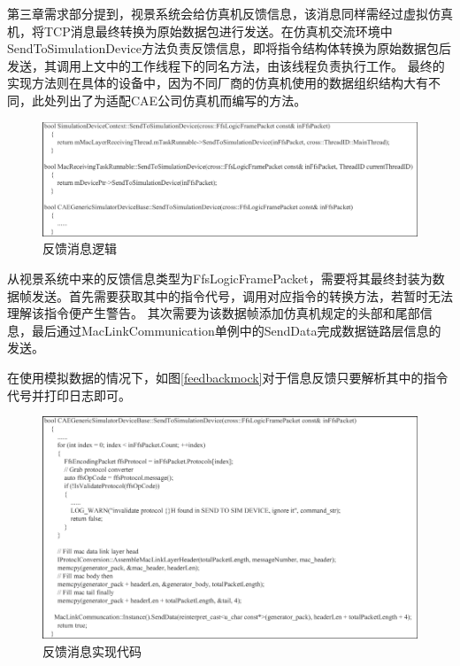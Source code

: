 \par
第三章需求部分提到，视景系统会给仿真机反馈信息，该消息同样需经过虚拟仿真机，将TCP消息最终转换为原始数据包进行发送。在仿真机交流环境中SendToSimulationDevice方法负责反馈信息，即将指令结构体转换为原始数据包后发送，其调用上文中的工作线程下的同名方法，由该线程负责执行工作。
最终的实现方法则在具体的设备中，因为不同厂商的仿真机使用的数据组织结构大有不同，此处列出了为适配CAE公司仿真机而编写的方法。
\begin{figure}[h!]
    \begin{center}
        \includegraphics[width=\textwidth]{pictures/code8.pdf}
        \caption{反馈消息逻辑}
    \end{center}
\end{figure}
\par
从视景系统中来的反馈信息类型为FfsLogicFramePacket，需要将其最终封装为数据帧发送。首先需要获取其中的指令代号，调用对应指令的转换方法，若暂时无法理解该指令便产生警告。
其次需要为该数据帧添加仿真机规定的头部和尾部信息，最后通过MacLinkCommunication单例中的SendData完成数据链路层信息的发送。
\par
在使用模拟数据的情况下，如图\ref{feedbackmock}对于信息反馈只要解析其中的指令代号并打印日志即可。
\begin{figure}[h!]
    \begin{center}
        \includegraphics[width=\textwidth]{pictures/code9.pdf}
        \caption{反馈消息实现代码}
    \end{center}
\end{figure}

